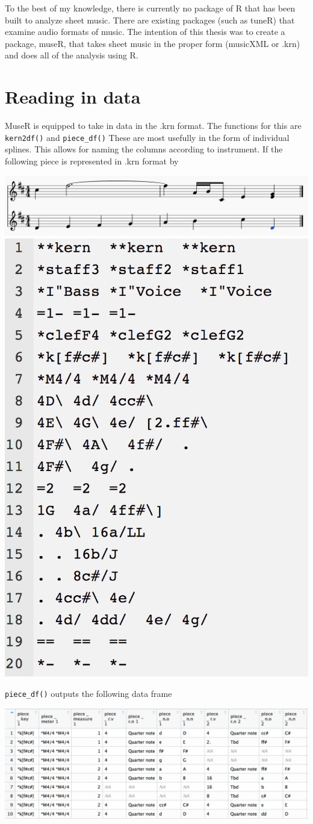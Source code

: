 \documentclass[12pt,twoside]{reedthesis}
\theoremstyle{definition}
\theoremstyle{definition}
\theoremstyle{definition}
\theoremstyle{remark}
\begin{document}
To the best of my knowledge, there is currently no package of R that has
been built to analyze sheet music. There are existing packages (such as
tuneR) that examine audio formats of music. The intention of this thesis
was to create a package, museR, that takes sheet music in the proper
form (musicXML or .krn) and does all of the analysis using R.

\section{Reading in data}\label{reading-in-data}

MuseR is equipped to take in data in the .krn format. The functions for
this are \texttt{kern2df()} and \texttt{piece\_df()} These are most
usefully in the form of individual splines. This allows for naming the
columns according to instrument. If the following piece is represented
in .krn format by

\includegraphics[width=0.5\linewidth]{images/ex1m}
\includegraphics[width=0.5\linewidth]{images/ex1k}

\texttt{piece\_df()} outputs the following data frame

\includegraphics[width=0.75\linewidth]{images/ex1r}
\end{document}

